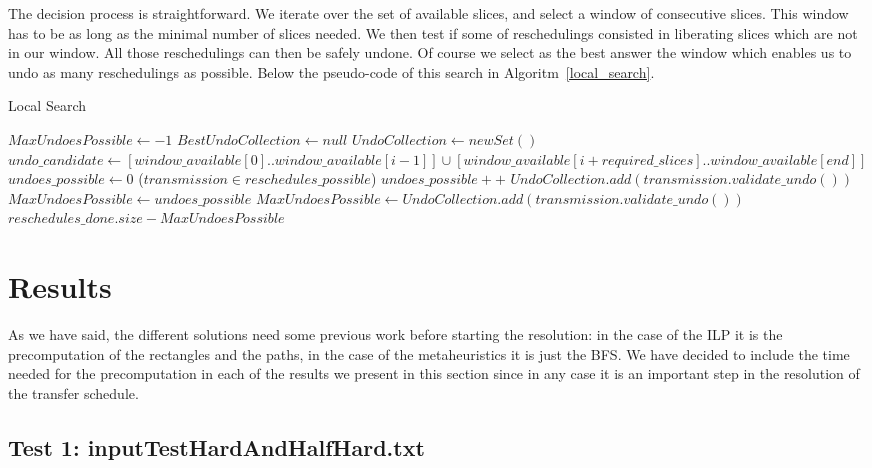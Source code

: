 \documentclass[11pt,a4paper]{article}
\begin{document}
The decision process is straightforward. We iterate over the set of available slices, and select a window of consecutive slices. This window has to be as long as the minimal number of slices needed. We then test if some of reschedulings consisted in liberating slices which are not in our window. All those reschedulings can then be safely undone. Of course we select as the best answer the window which enables us to undo as many reschedulings as possible. Below the pseudo-code of this search in Algoritm~\ref{local_search}.\\ 

\begin{algorithm}[H]
\caption{Local Search}\label{local_search}
\begin{algorithmic}[1]
	\State $MaxUndoesPossible \gets -1$
	\State $BestUndoCollection \gets null$
		\State $UndoCollection \gets new Set()$
		\State $undo\_candidate \gets [window\_available[0]..window\_available[i-1]] \cup [window\_available[i+required\_slices]..window\_available[end]]$
		\State $undoes\_possible\gets 0$
		\ForAll($transmission \in reschedules\_possible$)
				\State $undoes\_possible++$
				\State $UndoCollection.add(transmission.validate\_undo())$
			\EndIf
		\EndFor
			\State $MaxUndoesPossible \gets undoes\_possible$
			\State $MaxUndoesPossible \gets UndoCollection.add		(transmission.validate\_undo())$
		\EndIf
	\EndFor
	\State \Return $reschedules\_done.size - MaxUndoesPossible$
\EndProcedure
\end{algorithmic}
\end{algorithm}

\section{Results}
As we have said, the different solutions need some previous work before starting the resolution: in the case of the ILP it is the precomputation of the rectangles and the paths, in the case of the metaheuristics it is just the BFS. We have decided to include the time needed for the precomputation in each of the results we present in this section since in any case it is an important step in the resolution of the transfer schedule.

\subsection{Test 1: inputTestHardAndHalfHard.txt}
\end{document}
